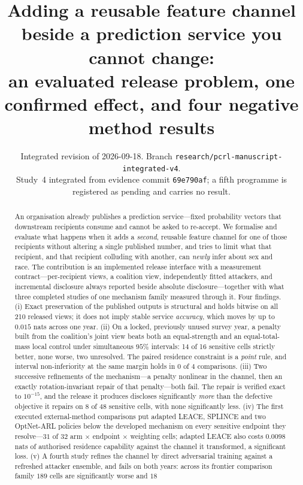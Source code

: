 \documentclass[10pt]{article}
\title{Adding a reusable feature channel beside a prediction service you cannot change:\\
an evaluated release problem, one confirmed effect, and four negative method results}
\author{}
\date{Integrated revision of 2026-09-18.
Branch \texttt{research/pcrl-manuscript-integrated-v4}.\\
\small Study~4 integrated from evidence commit \texttt{69e790af}; a fifth programme is registered as
pending and carries no result.}
\begin{document}
\maketitle

\begin{abstract}
An organisation already publishes a prediction service---fixed probability vectors that downstream
recipients consume and cannot be asked to re-accept. We formalise and evaluate what happens when it
adds a \emph{second}, reusable feature channel for one of those recipients without altering a single
published number, and tries to limit what that recipient, and that recipient colluding with another,
can \emph{newly} infer about sex and race. The contribution is an implemented release interface with
a measurement contract---per-recipient views, a coalition view, independently fitted attackers, and
incremental disclosure always reported beside absolute disclosure---together with what three
completed studies of one mechanism family measured through it. Four findings. (i) Exact preservation
of the published outputs is structural and holds bitwise on all 210 released views; it does not imply
stable service \emph{accuracy}, which moves by up to $0.015$ nats across one year. (ii) On a locked,
previously unused survey year, a penalty built from the coalition's joint view beats both an
equal-strength and an equal-total-mass local control under simultaneous $95\%$ intervals: 14 of 16
sensitive cells strictly better, none worse, two unresolved. The paired residence constraint is a
\emph{point} rule, and interval non-inferiority at the same margin holds in $0$ of $4$ comparisons.
(iii) Two successive refinements of the mechanism---a penalty nonlinear in the channel, then an
exactly rotation-invariant repair of that penalty---both fail. The repair is verified exact to
$10^{-15}$, and the release it produces discloses significantly \emph{more} than the defective
objective it repairs on $8$ of $48$ sensitive cells, with none significantly less. (iv) The first
executed external-method comparisons put adapted LEACE, SPLINCE and two OptNet-ARL policies below
the developed mechanism on every sensitive endpoint they resolve---$31$ of $32$ arm $\times$
endpoint $\times$ weighting cells; adapted LEACE also costs $0.0098$ nats of authorised
residence capability against the channel it transformed, a significant loss. (v) A fourth study
refines the channel by direct adversarial training against a refreshed attacker ensemble, and fails
on both years: across its frontier comparison family $189$ cells are significantly worse and $18$

\end{abstract}
\end{document}
